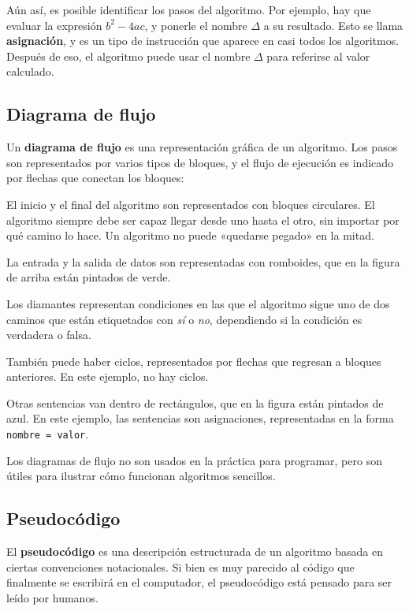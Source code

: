 Aún así, es posible identificar los pasos del algoritmo. Por ejemplo,
hay que evaluar la expresión \(b^2 - 4ac\), y ponerle el nombre \(\Delta\) a
su resultado. Esto se llama \textbf{asignación}, y es un tipo de
instrucción que aparece en casi todos los algoritmos. Después de eso, el
algoritmo puede usar el nombre \(\Delta\) para referirse al valor calculado.

\subsection{Diagrama de flujo}

Un \textbf{diagrama de flujo} es una representación gráfica de un
algoritmo. Los pasos son representados por varios tipos de bloques, y el
flujo de ejecución es indicado por flechas que conectan los bloques:


El inicio y el final del algoritmo son representados con bloques
circulares. El algoritmo siempre debe ser capaz llegar desde uno hasta
el otro, sin importar por qué camino lo hace. Un algoritmo no puede
«quedarse pegado» en la mitad.

La entrada y la salida de datos son representadas con romboides, que en
la figura de arriba están pintados de verde.

Los diamantes representan condiciones en las que el algoritmo sigue uno
de dos caminos que están etiquetados con \emph{sí} o \emph{no},
dependiendo si la condición es verdadera o falsa.

También puede haber ciclos, representados por flechas que regresan a
bloques anteriores. En este ejemplo, no hay ciclos.

Otras sentencias van dentro de rectángulos, que en la figura están
pintados de azul. En este ejemplo, las sentencias son asignaciones,
representadas en la forma \lstinline!nombre = valor!.

Los diagramas de flujo no son usados en la práctica para programar, pero
son útiles para ilustrar cómo funcionan algoritmos sencillos.

\subsection{Pseudocódigo}

El \textbf{pseudocódigo} es una descripción estructurada de un algoritmo
basada en ciertas convenciones notacionales. Si bien es muy parecido al
código que finalmente se escribirá en el computador, el pseudocódigo
está pensado para ser leído por humanos.

